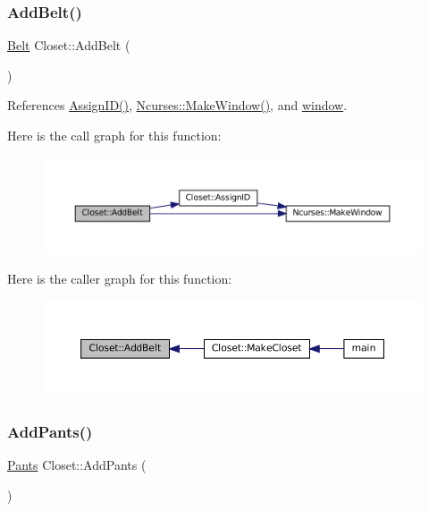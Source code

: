 \subsubsection{\texorpdfstring{Add\+Belt()}{AddBelt()}}
{\footnotesize\ttfamily \mbox{\hyperlink{classBelt}{Belt}} Closet\+::\+Add\+Belt (\begin{DoxyParamCaption}{ }\end{DoxyParamCaption})\hspace{0.3cm}{\ttfamily [private]}}



References \mbox{\hyperlink{classCloset_afabc27d621abdf0089a6b3027ea8f470}{Assign\+I\+D()}}, \mbox{\hyperlink{classNcurses_a1d8def11419a444c5696b5043da680d4}{Ncurses\+::\+Make\+Window()}}, and \mbox{\hyperlink{classCloset_af1eb4f786cc4eccd3018b90632236a93}{window}}.

Here is the call graph for this function\+:\nopagebreak
\begin{figure}[H]
\begin{center}
\leavevmode
\includegraphics[width=350pt]{classCloset_ad81782f2bb110f3a0a635a5ac1f929eb_cgraph}
\end{center}
\end{figure}
Here is the caller graph for this function\+:\nopagebreak
\begin{figure}[H]
\begin{center}
\leavevmode
\includegraphics[width=350pt]{classCloset_ad81782f2bb110f3a0a635a5ac1f929eb_icgraph}
\end{center}
\end{figure}
\mbox{\label{classCloset_a86001d9aab63ec5cca05bb2daa67e755}} 
\subsubsection{\texorpdfstring{Add\+Pants()}{AddPants()}}
{\footnotesize\ttfamily \mbox{\hyperlink{classPants}{Pants}} Closet\+::\+Add\+Pants (\begin{DoxyParamCaption}{ }\end{DoxyParamCaption})\hspace{0.3cm}{\ttfamily [private]}}



